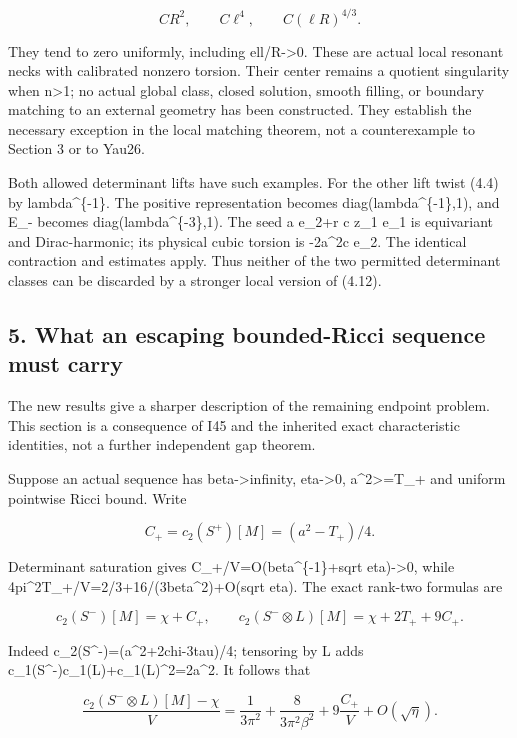 \documentclass[
  10pt,
]{article}
\begin{document}
\[
 C R^2,\qquad C\ell^4,\qquad C(\ell R)^{4/3}.        \tag{4.18}
\]

They tend to zero uniformly, including ell/R-\textgreater0. These are
actual local resonant necks with calibrated nonzero torsion. Their
center remains a quotient singularity when n\textgreater1; no actual
global class, closed solution, smooth filling, or boundary matching to
an external geometry has been constructed. They establish the necessary
exception in the local matching theorem, not a counterexample to Section
3 or to Yau26.

Both allowed determinant lifts have such examples. For the other lift
twist (4.4) by lambda\^{}\{-1\}. The positive representation becomes
diag(lambda\^{}\{-1\},1), and E\_- becomes diag(lambda\^{}\{-3\},1). The
seed a e\_2+r c z\_1 e\_1 is equivariant and Dirac-harmonic; its
physical cubic torsion is -2a\^{}2c e\_2. The identical contraction and
estimates apply. Thus neither of the two permitted determinant classes
can be discarded by a stronger local version of (4.12).

\hypertarget{what-an-escaping-bounded-ricci-sequence-must-carry}{%
\subsection{5. What an escaping bounded-Ricci sequence must
carry}\label{what-an-escaping-bounded-ricci-sequence-must-carry}}

The new results give a sharper description of the remaining endpoint
problem. This section is a consequence of I45 and the inherited exact
characteristic identities, not a further independent gap theorem.

Suppose an actual sequence has beta-\textgreater infinity,
eta-\textgreater0, a\^{}2\textgreater=T\_+ and uniform pointwise Ricci
bound. Write

\[
 C_+=c_2(S^+)[M]=(a^2-T_+)/4.
\]

Determinant saturation gives C\_+/V=O(beta\^{}\{-1\}+sqrt
eta)-\textgreater0, while 4pi\^{}2T\_+/V=2/3+16/(3beta\^{}2)+O(sqrt
eta). The exact rank-two formulas are

\[
 c_2(S^-)[M]=\chi+C_+,\qquad
 c_2(S^-\otimes L)[M]=\chi+2T_++9C_+.               \tag{5.1}
\]

Indeed c\_2(S\^{}-)=(a\^{}2+2chi-3tau)/4; tensoring by L adds
c\_1(S\^{}-)c\_1(L)+c\_1(L)\^{}2=2a\^{}2. It follows that

\[
 \frac{c_2(S^-\otimes L)[M]-\chi}{V}
   =\frac1{3\pi^2}+\frac8{3\pi^2\beta^2}
                     +9\frac{C_+}{V}+O(\sqrt\eta). \tag{5.2}
\]
\end{document}
